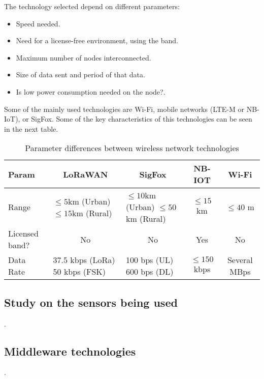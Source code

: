 The technology selected depend on different parameters:
\begin{itemize}
    \item Speed needed.
    \item Need for a license-free environment, using the  band.
    \item Maximum number of nodes interconnected.
    \item Size of data sent and period of that data.
    \item Is low power consumption needed on the node?.
\end{itemize}
Some of the mainly used technologies are Wi-Fi, mobile networks (LTE-M or NB-IoT),  or SigFox. Some of the key characteristics of this technologies can be seen in the next table.
\begin{table}[H]
    \begin{center}
        \begin{tabular}{p{} |  p{}  p{} p{} p{}}
            \hline
            \textbf{Param} & \multicolumn{1}{c}{\textbf{LoRaWAN}} & \multicolumn{1}{c}{\textbf{SigFox}} & \multicolumn{1}{c}{\textbf{NB-IOT}} & \multicolumn{1}{c}{\textbf{Wi-Fi}}\\
            \hline
            Range & \makecell{$\leq5$km (Urban)\\$\leq15$km (Rural)} & \makecell{$\leq10$km (Urban)\\$\leq50$km (Rural)} & \multicolumn{1}{c}{$\leq15$ km} & \multicolumn{1}{c}{$\leq40$ m}\\
            \hline
            Licensed band? & \multicolumn{1}{c}{No} & \multicolumn{1}{c}{No} & \multicolumn{1}{c}{Yes} & \multicolumn{1}{c}{No}\\
            \hline
            Data Rate & \makecell{37.5 kbps (LoRa) \\ 50 kbps (FSK)} & \makecell{100 bps (UL) \\ 600 bps (DL)} & \multicolumn{1}{c}{$\leq150$ kbps} & \multicolumn{1}{c}{Several MBps}\\
            \hline
        \end{tabular} 
    \end{center}
    \caption{Parameter differences between wireless network technologies}
    \label{ReqGeneral}
\end{table}

\subsection{Study on the sensors being used}
.

\subsection{Middleware technologies}
.